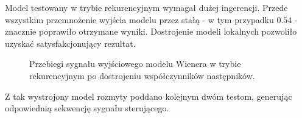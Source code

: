 Model testowany w trybie rekurencyjnym wymagał dużej ingerencji. Przede wszystkim przemnożenie wyjścia modelu przez stałą - w tym przypadku $\num{0.54}$ - znacznie poprawiło otrzymane wyniki. Dostrojenie modeli lokalnych pozwoliło uzyskać satysfakcjonujący rezultat.

\newpage

\begin{figure}[h!]
\centering
{}
\hfill
{}
\caption{Przebiegi sygnału wyjściowego modelu Wienera w trybie rekurencyjnym po dostrojeniu współczynników następników.}
\end{figure}

Z tak wystrojony model rozmyty poddano kolejnym dwóm testom, generując odpowiednią sekwencję sygnału sterującego.

